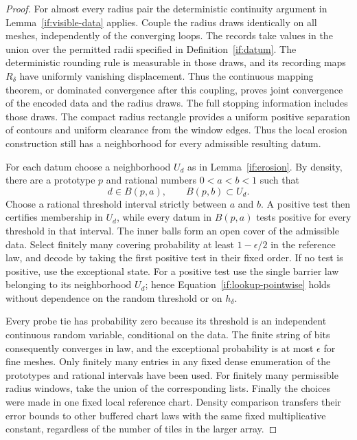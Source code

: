 \documentclass[11pt]{article}
\theoremstyle{definition}
\theoremstyle{remark}
\numberwithin{equation}{section}
\begin{document}
\begin{proof}
For almost every radius pair the deterministic continuity argument
in Lemma~\ref{if:visible-data} applies.  Couple the radius draws
identically on all meshes, independently of the converging loops.
The records take values in the union over the permitted radii specified
in Definition~\ref{if:datum}. The deterministic rounding rule is
measurable in those draws, and its recording maps $R_\delta$ have
uniformly vanishing displacement. Thus the continuous mapping theorem,
or dominated convergence after this coupling, proves joint convergence
of the encoded data and the radius draws. The full stopping information
includes those draws. The compact radius rectangle
provides a uniform positive separation of contours and uniform
clearance from the window edges.  Thus the local erosion construction
still has a neighborhood for every admissible resulting datum.

For each datum choose a neighborhood $U_d$ as in
Lemma~\ref{if:erosion}.  By density, there are a prototype $p$ and
rational numbers $0<a<b<1$ such that
\[
                  d\in B(p,a),\qquad B(p,b)\subset U_d.
\]
Choose a rational threshold interval strictly between $a$ and $b$.
A positive test then certifies membership in $U_d$, while every
datum in $B(p,a)$ tests positive for every threshold in that interval.
The inner balls form an open cover of the admissible data.  Select
finitely many covering probability at least $1-\epsilon/2$ in the
reference law, and decode by taking the first positive test in
their fixed order.  If no test is positive, use the exceptional
state.  For a positive test use the single barrier law belonging
to its neighborhood $U_d$; hence
Equation~\eqref{if:lookup-pointwise} holds without dependence on
the random threshold or on $h_\delta$.

Every probe tie has probability zero because its threshold is an
independent continuous random variable, conditional on the data.
The finite string of bits consequently converges in law, and the
exceptional probability is at most $\epsilon$ for fine meshes.
Only finitely many entries in any fixed dense enumeration of the
prototypes and rational intervals have been used.  For finitely
many permissible radius windows, take the union of the corresponding
lists.  Finally the choices were made in one fixed local reference
chart.  Density comparison transfers their error bounds to other
buffered chart laws with the same fixed multiplicative constant,
regardless of the number of tiles in the larger array.
\end{proof}



\end{document}
